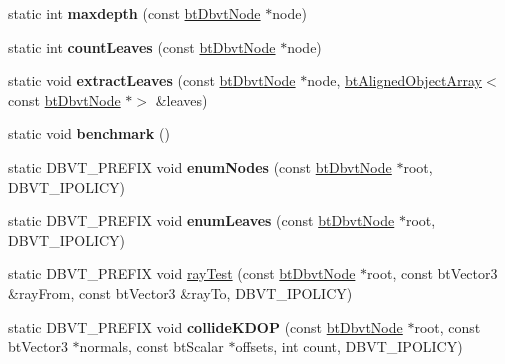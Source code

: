 \begin{DoxyCompactItemize}
\item 
\mbox{\label{structbtDbvt_aec8b277b3c47d6ce41334dc9758a169b}} 
static int {\bfseries maxdepth} (const \hyperlink{structbtDbvtNode}{bt\+Dbvt\+Node} $\ast$node)
\item 
\mbox{\label{structbtDbvt_ab832dd26afc34769ae85242307af9825}} 
static int {\bfseries count\+Leaves} (const \hyperlink{structbtDbvtNode}{bt\+Dbvt\+Node} $\ast$node)
\item 
\mbox{\label{structbtDbvt_ad509189d54fe7e43a2c0cdebfd69d54d}} 
static void {\bfseries extract\+Leaves} (const \hyperlink{structbtDbvtNode}{bt\+Dbvt\+Node} $\ast$node, \hyperlink{classbtAlignedObjectArray}{bt\+Aligned\+Object\+Array}$<$ const \hyperlink{structbtDbvtNode}{bt\+Dbvt\+Node} $\ast$$>$ \&leaves)
\item 
\mbox{\label{structbtDbvt_a3a00928493333d8adf3d27282c3450e4}} 
static void {\bfseries benchmark} ()
\item 
\mbox{\label{structbtDbvt_a3c2e1518e17541f83003b3c445d77b92}} 
static D\+B\+V\+T\+\_\+\+P\+R\+E\+F\+IX void {\bfseries enum\+Nodes} (const \hyperlink{structbtDbvtNode}{bt\+Dbvt\+Node} $\ast$root, D\+B\+V\+T\+\_\+\+I\+P\+O\+L\+I\+CY)
\item 
\mbox{\label{structbtDbvt_a98f3809446efbf886c89429869b9e099}} 
static D\+B\+V\+T\+\_\+\+P\+R\+E\+F\+IX void {\bfseries enum\+Leaves} (const \hyperlink{structbtDbvtNode}{bt\+Dbvt\+Node} $\ast$root, D\+B\+V\+T\+\_\+\+I\+P\+O\+L\+I\+CY)
\item 
static D\+B\+V\+T\+\_\+\+P\+R\+E\+F\+IX void \hyperlink{structbtDbvt_a8e316ee3bc9bd7b7354086c0c558cfb5}{ray\+Test} (const \hyperlink{structbtDbvtNode}{bt\+Dbvt\+Node} $\ast$root, const bt\+Vector3 \&ray\+From, const bt\+Vector3 \&ray\+To, D\+B\+V\+T\+\_\+\+I\+P\+O\+L\+I\+CY)
\item 
\mbox{\label{structbtDbvt_a8f00d2d902816fb3bc6ab5b3d69c1ec5}} 
static D\+B\+V\+T\+\_\+\+P\+R\+E\+F\+IX void {\bfseries collide\+K\+D\+OP} (const \hyperlink{structbtDbvtNode}{bt\+Dbvt\+Node} $\ast$root, const bt\+Vector3 $\ast$normals, const bt\+Scalar $\ast$offsets, int count, D\+B\+V\+T\+\_\+\+I\+P\+O\+L\+I\+CY)
$$
\end{DoxyCompactItemize}
